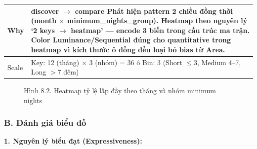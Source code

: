 \begin{longtable}{|p{2.8cm}|p{11.5cm}|}
\hline
Why & discover $\rightarrow$ compare \newline
Phát hiện pattern 2 chiều đồng thời (month $\times$ minimum\_nights\_group). Heatmap theo nguyên lý `2 keys $\rightarrow$ heatmap' --- encode 3 biến trong cấu trúc ma trận. Color Luminance/Sequential đúng cho quantitative trong heatmap vì kích thước ô đồng đều loại bỏ bias từ Area. \\
\hline
Scale & Key: 12 (tháng) $\times$ 3 (nhóm) = 36 ô \newline
Bin: 3 (Short $\leq$3, Medium 4--7, Long $>$7 đêm) \\
\hline
\end{longtable}

\begin{figure}[H]
    \centering
    \caption{Hình 8.2. Heatmap tỷ lệ lấp đầy theo tháng và nhóm minimum nights}
    \label{fig:domain-task8-chart2}
\end{figure}

\subsubsection*{B. Đánh giá biểu đồ}

\textbf{1. Nguyên lý biểu đạt (Expressiveness):}

